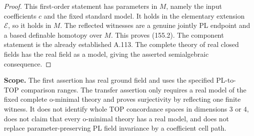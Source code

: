 \begin{proof}
This first-order statement has parameters in \(M\), namely the input
coefficients \(c\) and the fixed standard model. It holds in the
elementary extension \(\mathcal E\), so it holds in \(M\).
The reflected witnesses are a genuine jointly PL endpoint and a
based definable homotopy over \(M\). This proves (155.2).
The component statement is the already established A.113.
The complete theory of real closed fields has the real field as a
model, giving the asserted semialgebraic consequence.
\end{proof}

\textbf{Scope.}\quad
The first assertion has real ground field and uses the specified
PL-to-TOP comparison ranges. The transfer assertion only requires
a real model of the fixed complete o-minimal theory and proves
surjectivity by reflecting one finite witness. It does not identify
whole TOP concordance spaces in dimensions \(3\) or \(4\), does not
claim that every o-minimal theory has a real model, and does not
replace parameter-preserving PL field invariance by a coefficient
cell path.
